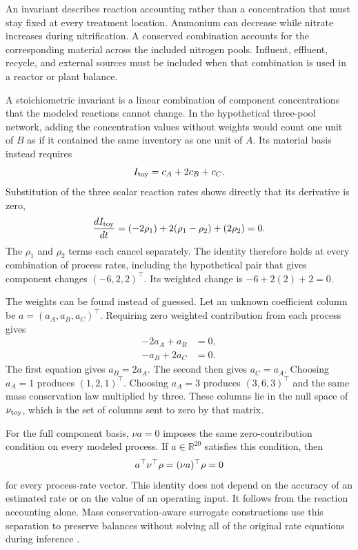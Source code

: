 An invariant describes reaction accounting rather than a concentration that must stay fixed at every treatment location. Ammonium can decrease while nitrate increases during nitrification. A conserved combination accounts for the corresponding material across the included nitrogen pools. Influent, effluent, recycle, and external sources must be included when that combination is used in a reactor or plant balance.

A stoichiometric invariant is a linear combination of component concentrations that the modeled reactions cannot change. In the hypothetical three-pool network, adding the concentration values without weights would count one unit of $B$ as if it contained the same inventory as one unit of $A$. Its material basis instead requires
\[
I_{\rm toy}=c_A+2c_B+c_C.
\]
Substitution of the three scalar reaction rates shows directly that its derivative is zero,
\[
\frac{d I_{\rm toy}}{dt}
=(-2\rho_1)+2(\rho_1-\rho_2)+(2\rho_2)=0.
\]
The $\rho_1$ and $\rho_2$ terms each cancel separately. The identity therefore holds at every combination of process rates, including the hypothetical pair that gives component changes $(-6,2,2)^\top$. Its weighted change is $-6+2(2)+2=0$.

The weights can be found instead of guessed. Let an unknown coefficient column be $a=(a_A,a_B,a_C)^\top$. Requiring zero weighted contribution from each process gives
\[
\begin{aligned}
-2a_A+a_B&=0,\\
-a_B+2a_C&=0.
\end{aligned}
\]
The first equation gives $a_B=2a_A$. The second then gives $a_C=a_A$. Choosing $a_A=1$ produces $(1,2,1)^\top$. Choosing $a_A=3$ produces $(3,6,3)^\top$ and the same mass conservation law multiplied by three. These columns lie in the null space of $\nu_{\rm toy}$, which is the set of columns sent to zero by that matrix.

For the full component basis, $\nu a=0$ imposes the same zero-contribution condition on every modeled process. If $a\in\mathbb{R}^{20}$ satisfies this condition, then
\begin{equation}
\equationname{Zero reaction contribution to a stoichiometric invariant}
a^\top\nu^\top\rho=(\nu a)^\top\rho=0
\label{eq:individual_invariant}
\end{equation}
for every process-rate vector. This identity does not depend on the accuracy of an estimated rate or on the value of an operating input. It follows from the reaction accounting alone. Mass conservation-aware surrogate constructions use this separation to preserve balances without solving all of the original rate equations during inference \citep{SturmWexler2020,SturmWexler2022,Hansen2024}.

